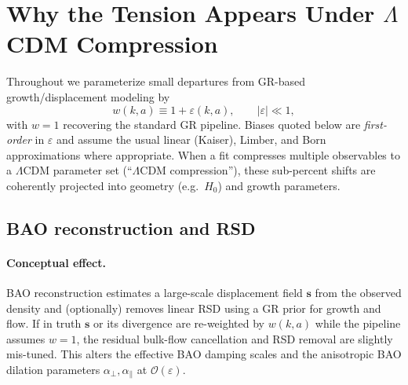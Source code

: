 \documentclass[11pt]{article}
\begin{document}
\section{Why the Tension Appears Under \texorpdfstring{$\Lambda$}{Λ}CDM Compression}
\label{sec:tension-under-lcdm}

\noindent
Throughout we parameterize small departures from GR-based growth/displacement modeling by
\begin{equation}
w(k,a) \equiv 1 + \varepsilon(k,a),\qquad |\varepsilon|\ll1,
\end{equation}
with $w=1$ recovering the standard GR pipeline. Biases quoted below are \emph{first-order} in $\varepsilon$ and assume the usual linear (Kaiser), Limber, and Born approximations where appropriate. When a fit compresses multiple observables to a $\Lambda$CDM parameter set (``$\Lambda$CDM compression''), these sub-percent shifts are coherently projected into geometry (e.g.\ $H_0$) and growth parameters.

\subsection{BAO reconstruction and RSD}
\label{subsec:bao-rsd}

\paragraph{Conceptual effect.}
BAO reconstruction estimates a large-scale displacement field $\boldsymbol{s}$ from the observed density and (optionally) removes linear RSD using a GR prior for growth and flow. If in truth $\boldsymbol{s}$ or its divergence are re-weighted by $w(k,a)$ while the pipeline assumes $w=1$, the residual bulk-flow cancellation and RSD removal are slightly mis-tuned. This alters the effective BAO damping scales and the anisotropic BAO dilation parameters $\alpha_{\perp},\alpha_{\parallel}$ at $\mathcal{O}(\varepsilon)$.
\end{document}
